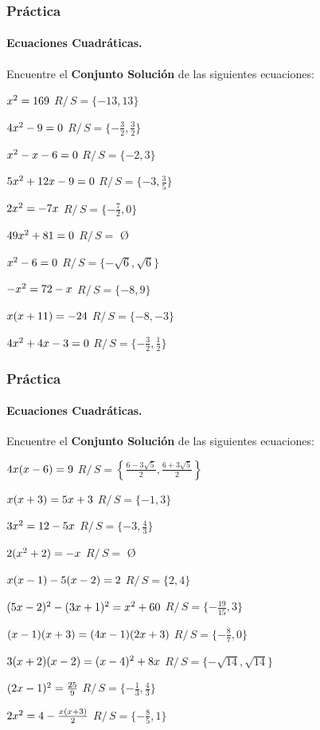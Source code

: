 \documentclass[mathserif]{beamer}
\begin{document}
\begin{frame}
\frametitle{\bf Práctica} 
\framesubtitle{Ecuaciones Cuadráticas.}

        \begin{exampleblock}{Encuentre el {\bf Conjunto Solución} de las siguientes ecuaciones:}
        \benu
        \item $x^2=169 \hfill$ {\boldmath $R/$}$\,S=\{-13,13\}$
        \item $4x^2-9=0 \hfill$ {\boldmath $R/$}$\,S=\{-\frac32,\frac32\}$
        \item $x^2-x-6=0 \hfill$ {\boldmath $R/$}$\,S=\{-2,3\}$
        \item $5x^2+12x-9=0 \hfill$ {\boldmath $R/$}$\,S=\{-3,\frac35\}$
        \item $2x^2=-7x \hfill$ {\boldmath $R/$}$\,S=\{-\frac72,0\}$
        \item $49x^2+81=0 \hfill$ {\boldmath $R/$}$\,S=$\,\,\O
        \item $x^2-6=0 \hfill$ {\boldmath $R/$}$\,S=\{-\sqrt6,\sqrt6\}$
        \item $-x^2=72-x \hfill$ {\boldmath $R/$}$\,S=\{-8,9\}$
        \item $x(x+11)=-24 \hfill$ {\boldmath $R/$}$\,S=\{-8,-3\}$
        \item $4x^2+4x-3=0 \hfill$ {\boldmath $R/$}$\,S=\{-\frac32,\frac12\}$
        \asuivre
        \eenu
        \end{exampleblock}
\end{frame}

\begin{frame}
\frametitle{\bf Práctica} 
\framesubtitle{Ecuaciones Cuadráticas.}

        \begin{exampleblock}{Encuentre el {\bf Conjunto Solución} de las siguientes ecuaciones:}
        \benu
        \suite
        \item $4x(x-6)=9\hfill$ {\boldmath $R/$}$\,S=\left\{\frac{6-3\sqrt5}{2},\frac{6+3\sqrt5}{2}\right\}$
        \item $x(x+3)=5x+3 \hfill$ {\boldmath $R/$}$\,S=\{-1,3\}$
        \item $3x^2=12-5x \hfill$ {\boldmath $R/$}$\,S=\{-3,\frac43\}$
        \item $2(x^2+2)=-x \hfill$ {\boldmath $R/$}$\,S=$\,\,\O
        \item $x(x-1)-5(x-2)=2 \hfill$ {\boldmath $R/$}$\,S=\{2,4\}$
        \item $(5x-2)^2-(3x+1)^2=x^2+60 \hfill$ {\boldmath $R/$}$\,S=\{-\frac{19}{15},3\}$
        \item $(x-1)(x+3)=(4x-1)(2x+3) \hfill$ {\boldmath $R/$}$\,S=\{-\frac87,0\}$
        \item $3(x+2)(x-2)=(x-4)^2+8x \hfill$ {\boldmath $R/$}$\,S=\{-\sqrt{14},\sqrt{14}\}$
        \item $(2x-1)^2=\frac{25}{9} \hfill$ {\boldmath $R/$}$\,S=\{-\frac13,\frac43\}$
        \item $2x^2=4-\frac{x(x+3)}{2} \hfill$ {\boldmath $R/$}$\,S=\{-\frac85,1\}$
        \eenu
        \end{exampleblock}
\end{frame}
\end{document}
